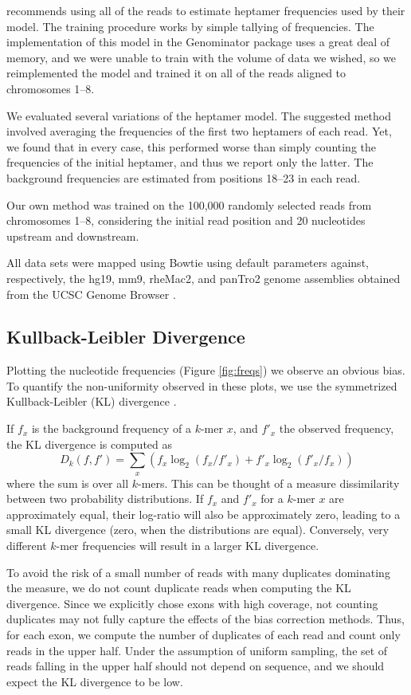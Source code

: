 \documentclass{bioinfo}
\begin{document}
\citet{Hansen2010} recommends using all of the reads to estimate heptamer
frequencies used by their model. The training procedure works by simple tallying
of frequencies. The implementation of this model in the Genominator package
uses a great deal of memory, and we were unable to train with the volume of
data we wished, so we reimplemented the model and trained it on all of the reads
aligned to chromosomes 1--8.

We evaluated several variations of the heptamer model. The suggested method
involved averaging the frequencies of the first two heptamers of each read. Yet,
we found that in every case, this performed worse than simply counting the
frequencies of the initial heptamer, and thus we report only the latter. The
background frequencies are estimated from positions 18--23 in each read.

Our own method was trained on the 100,000 randomly selected reads from
chromosomes 1--8, considering the initial read position and 20 nucleotides
upstream and downstream.

All data sets were mapped using Bowtie \citep{Langmead2009} using default
parameters against, respectively, the hg19, mm9, rheMac2, and panTro2 genome
assemblies obtained from the UCSC Genome Browser \citep{Karolchik2008}.



\subsection{Kullback-Leibler Divergence}

Plotting the nucleotide frequencies (Figure  \ref{fig:freqs}) we observe an
obvious bias. To quantify the non-uniformity observed in these plots, we use the
symmetrized Kullback-Leibler (KL) divergence \citep{Kullback1951}.

If $f_x$ is the background frequency of a $k$-mer $x$, and $f'_x$ the observed
frequency, the KL divergence is computed as
$$D_k( f, f' ) = \sum_{x} \left( f_x \log_{2}( f_x / f'_x ) + f'_x \log_{2}( f'_x / f_x) \right)$$
where the sum is over all $k$-mers. This can be thought of a measure
dissimilarity between two probability distributions. If $f_x$ and $f'_x$ for a
$k$-mer $x$ are approximately equal, their log-ratio will also be approximately
zero, leading to a small KL divergence (zero, when the distributions are equal).
Conversely, very different $k$-mer frequencies will result in a larger KL
divergence.

To avoid the risk of a small number of reads with many duplicates dominating the
measure, we do not count duplicate reads when computing the KL divergence. Since we
explicitly chose exons with high coverage, not counting duplicates may not
fully capture the effects of the bias correction methods. Thus, for each exon,
we compute the number of duplicates of each read and count only reads in the
upper half. Under the assumption of uniform sampling, the set of reads falling
in the upper half should not depend on sequence, and we should expect the KL
divergence to be low.
\end{document}
